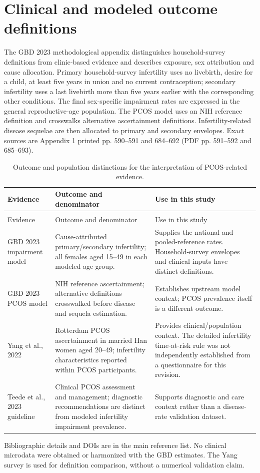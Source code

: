 \documentclass[11pt,a4paper]{article}
\begin{document}
\section*{Clinical and modeled outcome definitions}
The GBD 2023 methodological appendix distinguishes household-survey definitions from clinic-based evidence and describes exposure, sex attribution and cause allocation. Primary household-survey infertility uses no livebirth, desire for a child, at least five years in union and no current contraception; secondary infertility uses a last livebirth more than five years earlier with the corresponding other conditions. The final sex-specific impairment rates are expressed in the general reproductive-age population. The PCOS model uses an NIH reference definition and crosswalks alternative ascertainment definitions. Infertility-related disease sequelae are then allocated to primary and secondary envelopes. Exact sources are Appendix 1 printed pp. 590--591 and 684--692 (PDF pp. 591--592 and 685--693).

\small
\begin{longtable}{p{}p{}p{}}
\caption{Outcome and population distinctions for the interpretation of PCOS-related evidence.}\label{tab:s11}\\
\toprule Evidence & Outcome and denominator & Use in this study\\\midrule\endfirsthead
\caption[]{Outcome and population distinctions for the interpretation of PCOS-related evidence.}\\
\toprule Evidence & Outcome and denominator & Use in this study\\\midrule\endhead
GBD 2023 impairment model & Cause-attributed primary/secondary infertility; all females aged 15--49 in each modeled age group. & Supplies the national and pooled-reference rates. Household-survey envelopes and clinical inputs have distinct definitions.\\
GBD 2023 PCOS model & NIH reference ascertainment; alternative definitions crosswalked before disease and sequela estimation. & Establishes upstream model context; PCOS prevalence itself is a different outcome.\\
Yang et al., 2022 & Rotterdam PCOS ascertainment in married Han women aged 20--49; infertility characteristics reported within PCOS participants. & Provides clinical/population context. The detailed infertility time-at-risk rule was not independently established from a questionnaire for this revision.\\
Teede et al., 2023 guideline & Clinical PCOS assessment and management; diagnostic recommendations are distinct from modeled infertility impairment prevalence. & Supports diagnostic and care context rather than a disease-rate validation dataset.\\\bottomrule
\end{longtable}\normalsize
Bibliographic details and DOIs are in the main reference list. No clinical microdata were obtained or harmonized with the GBD estimates. The Yang survey is used for definition comparison, without a numerical validation claim.
\end{document}
